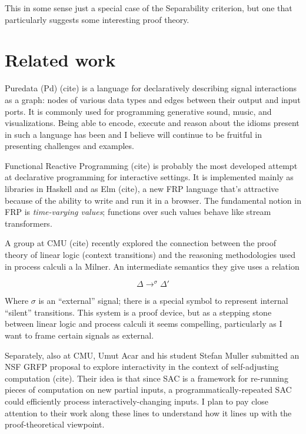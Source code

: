\documentclass{article}
\begin{document}
This in some sense just a special case of the Separability
criterion, but one that particularly suggests some interesting proof
theory.


\section{Related work}

Puredata (Pd) (cite) is a language for declaratively describing signal
interactions as a graph: nodes of various data types and edges between
their output and input ports. It is commonly used for programming
generative sound, music, and visualizations. Being able to encode, execute
and reason about the idioms present in such a language has been and I
believe will continue to be fruitful in presenting challenges and examples.

Functional Reactive Programming (cite) is probably the most developed attempt at 
declarative programming for interactive settings. It is implemented mainly
as libraries in Haskell and as Elm (cite), a new FRP language that's
attractive because of the ability to write and run it in a browser. The
fundamental notion in FRP is {\em time-varying values}; functions over such
values behave like stream transformers.

A group at CMU (cite) recently explored the connection between the proof
theory of linear logic (context transitions) and the reasoning
methodologies used in process calculi a la Milner. An intermediate
semantics they give uses a relation

\[
\Delta \longrightarrow^{\sigma} \Delta'
\]

Where $\sigma$ is an ``external'' signal; there is a special symbol to
represent internal ``silent'' transitions. This system is a proof device,
but as a stepping stone between linear logic and process calculi it seems
compelling, particularly as I want to frame certain signals as external.

Separately, also at CMU, Umut Acar and his student Stefan Muller submitted
an NSF GRFP proposal to explore interactivity in the context of
self-adjusting computation (cite). Their idea is that since SAC is a
framework for re-running pieces of computation on new partial inputs, a
programmatically-repeated SAC could efficiently process
interactively-changing inputs. I plan to pay close attention to their work
along these lines to understand how it lines up with the proof-theoretical
viewpoint.
\end{document}
